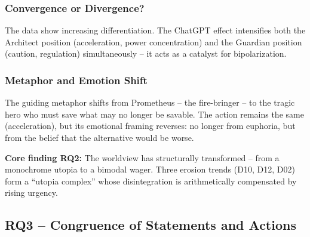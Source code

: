 \documentclass[12pt,a4paper]{article}
\begin{document}
\subsubsection{Convergence or Divergence?}

The data show increasing differentiation. The ChatGPT effect intensifies both the Architect position (acceleration, power concentration) and the Guardian position (caution, regulation) simultaneously -- it acts as a catalyst for bipolarization.


\subsubsection{Metaphor and Emotion Shift}

The guiding metaphor shifts from Prometheus -- the fire-bringer -- to the tragic hero who must save what may no longer be savable. The action remains the same (acceleration), but its emotional framing reverses: no longer from euphoria, but from the belief that the alternative would be worse.

\medskip
\noindent\textbf{Core finding RQ2:} The worldview has structurally transformed -- from a monochrome utopia to a bimodal wager. Three erosion trends (D10, D12, D02) form a ``utopia complex'' whose disintegration is arithmetically compensated by rising urgency.


\subsection{RQ3 -- Congruence of Statements and Actions}
\label{sec:ergebnisse:f3}
\end{document}
